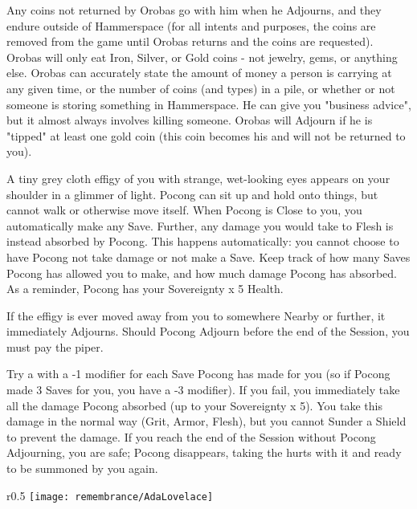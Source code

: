 Any coins not returned by Orobas go with him when he Adjourns, and they endure outside of Hammerspace (for all intents and purposes, the coins are removed from the game until Orobas returns and the coins are requested). Orobas will only eat Iron, Silver, or Gold coins - not jewelry, gems, or anything else.  Orobas can accurately state the amount of money a person is carrying at any given time, or the number of coins (and types) in a pile, or whether or not someone is storing something in Hammerspace.  He can give you "business advice", but it almost always involves killing someone. Orobas will Adjourn if he is "tipped" at least one gold coin (this coin becomes his and will not be returned to you).




A tiny grey cloth effigy of you with strange, wet-looking eyes appears on your shoulder in a glimmer of light.  Pocong can sit up and hold onto things, but cannot walk or otherwise move itself. When Pocong is Close to you, you automatically make any Save. Further, any damage you would take to Flesh is instead absorbed by Pocong. This happens automatically: you cannot choose to have Pocong not take damage or not make a Save. Keep track of how many Saves Pocong has allowed you to make, and how much damage Pocong has absorbed. As a reminder, Pocong has your Sovereignty x 5 Health.

If the effigy is ever moved away from you to somewhere Nearby or further, it immediately Adjourns. Should Pocong Adjourn before the end of the Session, you must pay the piper. 

Try a  with a -1 modifier for each Save Pocong has made for you (so if Pocong made 3 Saves for you, you have a -3 modifier). If you fail, you immediately take all the damage Pocong absorbed (up to your Sovereignty x 5).  You take this damage in the normal way (Grit, Armor, Flesh), but you cannot Sunder a Shield to prevent the damage. If you reach the end of the Session without Pocong Adjourning, you are safe; Pocong disappears, taking the hurts with it and ready to be summoned by you again.

\newpage




\begin{wrapfigure}[25]{r}{0.5\textwidth}
    \texttt{[image: remembrance/AdaLovelace]}
\end{wrapfigure}


